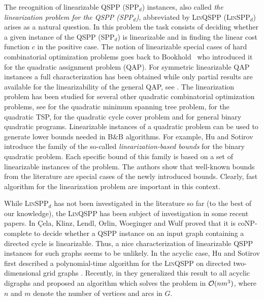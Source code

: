 The recognition of linearizable QSPP (SPP$_d$) instances, also
called \emph{the linearization problem for the QSPP (SPP$_d$)}, abbreviated by \textsc{Lin}QSPP (\textsc{Lin}SPP$_d$) arises 
as a natural question. In this problem the task 
consists of deciding whether a
given  instance of the  QSPP (SPP$_d$)  is linearizable and in finding the linear cost function
$c$ in the positive case.
The 
notion of 
linearizable special cases of hard
combinatorial optimization problems  goes back to
 Bookhold~\cite{bookhold1990contribution} who introduced 
 it for  the quadratic assignment problem (QAP). 
 For symmetric linearizable QAP instances a full characterization has been obtained while
 only partial results are available for the linearizability of the general QAP, see
 \cite{CeDeWo2016,Erdogan2006,ErTa2007,ErTa2011,kabadi2011n,punnen2013linear,waddellcharacterizing}.
The linearization problem has been studied for several other quadratic combinatorial optimization problems, see  \cite{CuPu2018,sotirov2021quadratic}
for the quadratic minimum spanning tree problem,  \cite{PuWaWo2017} for the quadratic TSP, \cite{deMeSo2020} for the quadratic cycle cover problem and  \cite{huSo2021} for general binary quadratic programs.  
Linearizable instances of  a quadratic problem can be used  to generate lower bounds  needed   in B\&B algorithms. For example, Hu and Sotirov introduce the family of the so-called \emph{linearization-based bounds} \cite{huSo2021} for the binary quadratic problem. Each specific bound of this family is based on   a set of linearizable instances of the problem. The authors show that 
well-known bounds from the literature are special cases of the newly introduced bounds.
Clearly, fast algorithm for the  linearization problem are important in 
this context.
\smallskip

While \textsc{Lin}SPP$_d$ has not been investigated in the literature so far (to the best of our knowledge), the  \textsc{Lin}QSPP has been subject of investigation in some recent papers.
In \cite{cela2021linearizable} \c{C}ela, Klinz, Lendl, Orlin, Woeginger and
Wulf proved  that it  is  coNP-complete to decide whether a   QSPP instance on an   input graph
containing   a directed cycle is linearizable.    Thus, a nice characterization of linearizable QSPP
  instances for such  graphs
  seems to be
  unlikely.
   In the acyclic case, Hu and Sotirov first described a polynomial-time
   algorithm for the \textsc{Lin}QSPP  on  directed
   two-dimensional grid graphs \cite{huSo2018}. Recently, in  \cite{huSo2021} they  generalized this
   result to all acyclic digraphs and proposed  an algorithm which solves the
   problem in $\mathcal{O}(nm^3)$, where $n$ and $m$ denote the number of vertices and
   arcs in 
   $G$.
\smallskip
   
